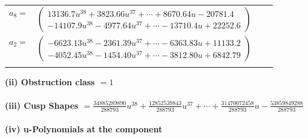 \documentclass[1p]{elsarticle_modified}
\theoremstyle{definition}
\begin{document}
\begin{tabular}{m{7pt} m{180pt} m{7pt} m{180pt} }
\flushright $a_{8}=$&$\begin{pmatrix}13136.7 u^{38}+3823.66 u^{37}+\cdots+8670.64 u-20781.4\\-14107.9 u^{38}-4977.64 u^{37}+\cdots-13710.4 u+22252.6\end{pmatrix}$ \\
\flushright $a_{2}=$&$\begin{pmatrix}-6623.13 u^{38}-2361.39 u^{37}+\cdots-6363.83 u+11133.2\\-4052.45 u^{38}-1454.40 u^{37}+\cdots-3812.80 u+6842.79\end{pmatrix}$\\&\end{tabular}
\flushleft \textbf{(ii) Obstruction class $= 1$}\\~\\
\flushleft \textbf{(iii) Cusp Shapes $= \frac{34885289890}{288793} u^{38}+\frac{12852539843}{288793} u^{37}+\cdots+\frac{31470072458}{288793} u-\frac{53859849288}{288793}$}\\~\\
\newpage\renewcommand{\arraystretch}{1}
\flushleft \textbf{(iv) u-Polynomials at the component}\newline \\
\end{document}
